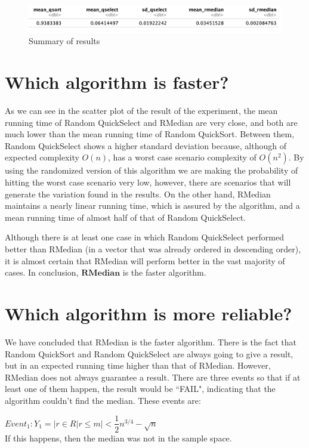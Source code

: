 \documentclass[11pt, oneside]{article}   	%
\begin{document}
\begin{figure}[H]
\centering
  \includegraphics[scale=0.7]{sumexp.png}
  \caption{Summary of results}
  \label{fig:ransum1}
\end{figure}


\section{Which algorithm is faster?}

As we can see in the scatter plot of the result of the experiment, the mean running time of Random QuickSelect and RMedian are very close, and both are much lower than the mean running time of Random QuickSort. Between them, Random QuickSelect shows a higher standard deviation because, although of expected complexity $O(n)$, has a worst case scenario complexity of $O(n^2)$. By using the randomized version of this algorithm we are making the probability of hitting the worst case scenario very low, however, there are scenarios that will generate the variation found in the results. On the other hand, RMedian maintains a nearly linear running time, which is assured by the algorithm, and a mean running time of almost half of that of Random QuickSelect.

Although there is at least one case in which Random QuickSelect performed better than RMedian (in a vector that was already ordered in descending order), it is almost certain that RMedian will perform better in the vast majority of cases. In conclusion, $\textbf{RMedian}$ is the faster algorithm.

\section{Which algorithm is more reliable?}

We have concluded that RMedian is the faster algorithm. There is the fact that Random QuickSort and Random QuickSelect are always going to give a result, but in an expected running time higher than that of RMedian. However, RMedian does not always guarantee a result. There are three events so that if at least one of them happen, the result would be ``FAIL", indicating that the algorithm couldn't find the median. These events are:

$Event_1 : Y_1 = |{r \in R | r \leq m}| < \dfrac{1}{2}n^{3/4} - \sqrt{n}$\\
If this happens, then the median was not in the sample space.
\end{document}
